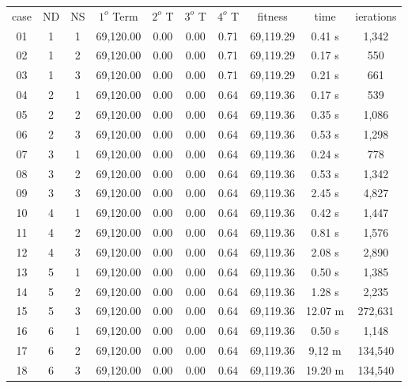 \documentclass{singlecol}
\theoremstyle{TH}{
\newtheorem{lemma}{Lemma}
\newtheorem{theorem}[lemma]{Theorem}
\newtheorem{corrolary}[lemma]{Corrolary}
\newtheorem{conjecture}[lemma]{Conjecture}
\newtheorem{proposition}[lemma]{Proposition}
\newtheorem{claim}[lemma]{Claim}
\newtheorem{stheorem}[lemma]{Wrong Theorem}
\newtheorem{algorithm}{Algorithm}
}
\theoremstyle{THrm}{
\newtheorem{definition}{Definition}[section]
\newtheorem{question}{Question}[section]
\newtheorem{remark}{Remark}
\newtheorem{scheme}{Scheme}
}
\theoremstyle{THhit}{
\newtheorem{case}{Case}[section]
}
\begin{document}
\begin{table}[h!]
\begin{center}
\begin{small}
	\begin{tabular}{ c c c c c c c c c c }     
	case & ND & NS &  $1^o$ Term & $2^o$ T & $3^o$ T & $4^o$ T &  fitness  &  time  & ierations     \\
	 01  &  1 & 1  &  69,120.00 &  0.00  & 0.00 &  0.71 & 69,119.29  & 0.41 s & 1,342     \\
	 02  &  1 & 2  & 69,120.00 &  0.00  & 0.00 & 0.71 &   69,119.29 & 0.17 s & 550  \\
	 03  &  1 & 3  & 69,120.00 &  0.00  & 0.00 & 0.71 &   69,119.29  & 0.21 s & 661   \\
	 04  &  2 & 1  & 69,120.00 & 0.00  & 0.00 & 0.64 & 69,119.36 & 0.17 s & 539     \\
	 05  &  2 & 2  & 69,120.00 &  0.00  & 0.00 & 0.64  & 69,119.36 & 0.35 s & 1,086     \\
	 06  &  2 & 3  & 69,120.00 &  0.00  & 0.00 & 0.64 & 69,119.36 & 0.53 s & 1,298     \\
	 07  &  3 & 1  & 69,120.00  &  0.00  & 0.00 & 0.64  & 69,119.36 & 0.24 s & 778     \\
	 08  &  3 & 2  & 69,120.00 &  0.00 & 0.00 & 0.64  & 69,119.36  & 0.53 s & 1,342     \\
	 09  &  3 & 3  & 69,120.00 &  0.00  & 0.00 &  0.64 &   69,119.36  & 2.45 s & 4,827 \\
	 10  &  4 & 1  & 69,120.00 & 0.00  & 0.00 & 0.64 &  69,119.36  & 0.42 s & 1,447   \\
	 11  &  4 & 2  & 69,120.00  & 0.00  & 0.00 &  0.64  &   69,119.36  & 0.81 s & 1,576     \\
	 12  &  4 & 3  & 69,120.00  &  0.00  & 0.00 &  0.64 &   69,119.36  & 2.08 s & 2,890  \\
	 13  &  5 & 1  & 69,120.00 &  0.00  & 0.00 &  0.64 & 69,119.36 & 0.50 s & 1,385    \\
	 14  &  5 & 2  & 69,120.00 &  0.00 & 0.00 & 0.64 &  69,119.36 & 1.28 s & 2,235 \\
	 15  &  5 & 3  & 69,120.00 &  0.00  & 0.00 & 0.64 &   69,119.36  & 12.07 m & 272,631    \\
	 16  &  6 & 1  & 69,120.00 & 0.00  & 0.00 & 0.64 & 69,119.36 & 0.50 s & 1,148 \\
	 17  &  6 & 2  & 69,120.00 & 0.00  & 0.00 &  0.64 & 69,119.36  & 9,12 m & 134,540 \\
	 18  &  6 & 3  & 69,120.00 &  0.00  & 0.00 & 0.64 &   69,119.36  & 19.20 m & 134,540 \\

\end{tabular}
\end{small}
\end{center}
\end{table}
\end{document}
